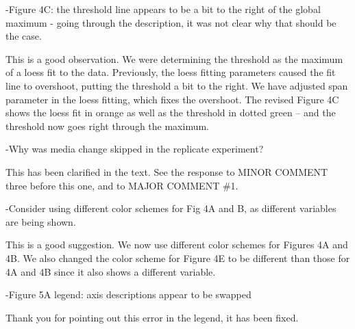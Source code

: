 \documentclass[11pt, oneside]{article}   	%
\begin{document}
-Figure 4C: the threshold line appears to be a bit to the right of the global maximum - going through the description, it was not clear why that should be the case. 

{\color{black} 
This is a good observation. 
We were determining the threshold as the maximum of a loess fit to the data. 
Previously, the loess fitting parameters caused the fit line to overshoot, putting the threshold a bit to the right.
We have adjusted span parameter in the loess fitting, which fixes the overshoot.
The revised Figure 4C shows the loess fit in orange as well as the threshold in dotted green -- and the threshold now goes right through the maximum.
}

-Why was media change skipped in the replicate experiment? 

{\color{black} 
This has been clarified in the text.
See the response to MINOR COMMENT three before this one, and to MAJOR COMMENT \#1.}

-Consider using different color schemes for Fig 4A and B, as different variables are being shown. 

{\color{black} 
This is a good suggestion.
We now use different color schemes for Figures 4A and 4B.
We also changed the color scheme for Figure 4E to be different than those for 4A and 4B since it also shows a different variable.}

-Figure 5A legend: axis descriptions appear to be swapped

{\color{black}
Thank you for pointing out this error in the legend, it has been fixed.
}
\end{document}
